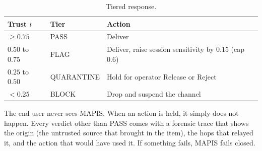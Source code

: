 \begin{table}[H]
\centering\small
\begin{tabular}{lll}
\toprule
Trust $t$ & Tier & Action\\
\midrule
$\ge 0.75$ & PASS & Deliver\\
$0.50$ to $0.75$ & FLAG & Deliver, raise session sensitivity by $0.15$ (cap $0.6$)\\
$0.25$ to $0.50$ & QUARANTINE & Hold for operator Release or Reject\\
$< 0.25$ & BLOCK & Drop and suspend the channel\\
\bottomrule
\end{tabular}
\caption{Tiered response.}
\end{table}
The end user never sees MAPIS. When an action is held, it simply does not happen. Every verdict other than PASS comes with a forensic trace that shows the origin (the untrusted source that brought in the item), the hops that relayed it, and the action that would have used it. If something fails, MAPIS fails closed.
